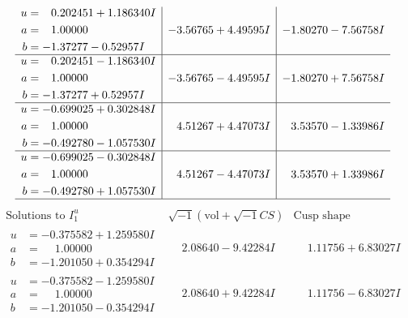 \documentclass[1p]{elsarticle_modified}
\theoremstyle{definition}
\newcommand{\I}{\sqrt{-1}}
\begin{document}
$$\begin{array}{c|c|c}
\begin{aligned}
u &= \phantom{-}0.202451 + 1.186340 I \\
a &= \phantom{-}1.00000\phantom{ +0.000000I} \\
b &= -1.37277 - 0.52957 I\end{aligned}
 & -3.56765 + 4.49595 I & -1.80270 - 7.56758 I \\ \hline\begin{aligned}
u &= \phantom{-}0.202451 - 1.186340 I \\
a &= \phantom{-}1.00000\phantom{ +0.000000I} \\
b &= -1.37277 + 0.52957 I\end{aligned}
 & -3.56765 - 4.49595 I & -1.80270 + 7.56758 I \\ \hline\begin{aligned}
u &= -0.699025 + 0.302848 I \\
a &= \phantom{-}1.00000\phantom{ +0.000000I} \\
b &= -0.492780 - 1.057530 I\end{aligned}
 & \phantom{-}4.51267 + 4.47073 I & \phantom{-}3.53570 - 1.33986 I \\ \hline\begin{aligned}
u &= -0.699025 - 0.302848 I \\
a &= \phantom{-}1.00000\phantom{ +0.000000I} \\
b &= -0.492780 + 1.057530 I\end{aligned}
 & \phantom{-}4.51267 - 4.47073 I & \phantom{-}3.53570 + 1.33986 I\\
 \hline 
 \end{array}$$\newpage$$\begin{array}{c|c|c}  
\text{Solutions to }I^u_{1}& \I (\text{vol} + \sqrt{-1}CS) & \text{Cusp shape}\\
 \hline 
\begin{aligned}
u &= -0.375582 + 1.259580 I \\
a &= \phantom{-}1.00000\phantom{ +0.000000I} \\
b &= -1.201050 + 0.354294 I\end{aligned}
 & \phantom{-}2.08640 - 9.42284 I & \phantom{-}1.11756 + 6.83027 I \\ \hline\begin{aligned}
u &= -0.375582 - 1.259580 I \\
a &= \phantom{-}1.00000\phantom{ +0.000000I} \\
b &= -1.201050 - 0.354294 I\end{aligned}
 & \phantom{-}2.08640 + 9.42284 I & \phantom{-}1.11756 - 6.83027 I \\ \hline\begin{aligned}

\end{aligned}
\end{array}$$
\end{document}
